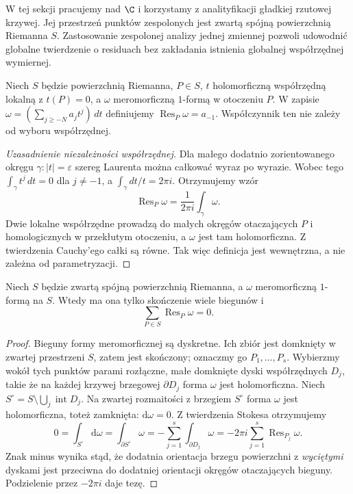 W tej sekcji pracujemy nad $\C$ i korzystamy z
analityfikacji gładkiej rzutowej krzywej. Jej
przestrzeń punktów zespolonych jest zwartą
spójną powierzchnią Riemanna $S$. Zastosowanie
zespolonej analizy jednej zmiennej pozwoli
udowodnić globalne twierdzenie o residuach bez
zakładania istnienia globalnej współrzędnej wymiernej.

\begin{definicja}
Niech $S$ będzie powierzchnią Riemanna, $P\in S$,
$t$ holomorficzną współrzędną lokalną z $t(P)=0$,
a $\omega$ meromorficzną $1$-formą w otoczeniu $P$.
W zapisie
$\omega=(\sum_{j\ge-N}a_jt^j)\,dt$
definiujemy $\operatorname{Res}_P\omega=a_{-1}$.
Współczynnik ten nie zależy od wyboru współrzędnej.
\end{definicja}
\begin{proof}[Uzasadnienie niezależności współrzędnej]
Dla małego dodatnio zorientowanego okręgu
$\gamma:|t|=\varepsilon$ szereg Laurenta można
całkować wyraz po wyrazie. Wobec tego
$\int_\gamma t^j\,dt=0$ dla $j\ne-1$,
a $\int_\gamma dt/t=2\pi i$. Otrzymujemy wzór
\[
\operatorname{Res}_P\omega=
 \frac1{2\pi i}\int_\gamma\omega.
\]
Dwie lokalne współrzędne prowadzą do małych
okręgów otaczających $P$ i homologicznych w
przekłutym otoczeniu, a $\omega$ jest tam
holomorficzna. Z twierdzenia Cauchy'ego całki
są równe. Tak więc definicja jest wewnętrzna,
a nie zależna od parametryzacji.
\end{proof}

\begin{twierdzenie}
\label{tw:residue-general}
Niech $S$ będzie zwartą spójną powierzchnią
Riemanna, a $\omega$ meromorficzną $1$-formą na $S$.
Wtedy ma ona tylko skończenie wiele biegunów i
\[
\sum_{P\in S}\operatorname{Res}_P\omega=0.
\]
\end{twierdzenie}
\begin{proof}
Bieguny formy meromorficznej są dyskretne.
Ich zbiór jest domknięty w zwartej przestrzeni $S$,
zatem jest skończony; oznaczmy go $P_1,\ldots,P_s$.
Wybierzmy wokół tych punktów parami rozłączne,
małe domknięte dyski współrzędnych $D_j$,
takie że na każdej krzywej brzegowej $\partial D_j$
forma $\omega$ jest holomorficzna.
Niech $S^\circ=S\setminus\bigcup_j\operatorname{int}D_j$.
Na zwartej rozmaitości z brzegiem $S^\circ$
forma $\omega$ jest holomorficzna, toteż zamknięta:
$\mathrm d\omega=0$. Z twierdzenia Stokesa
otrzymujemy
\[
0=\int_{S^\circ}\mathrm d\omega
 =\int_{\partial S^\circ}\omega
 =-\sum_{j=1}^s\int_{\partial D_j}\omega
 =-2\pi i\sum_{j=1}^s\operatorname{Res}_{P_j}\omega.
\]
Znak minus wynika stąd, że dodatnia orientacja
brzegu powierzchni z \emph{wyciętymi} dyskami
jest przeciwna do dodatniej orientacji okręgów
otaczających bieguny. Podzielenie przez $-2\pi i$
daje tezę.
\end{proof}

